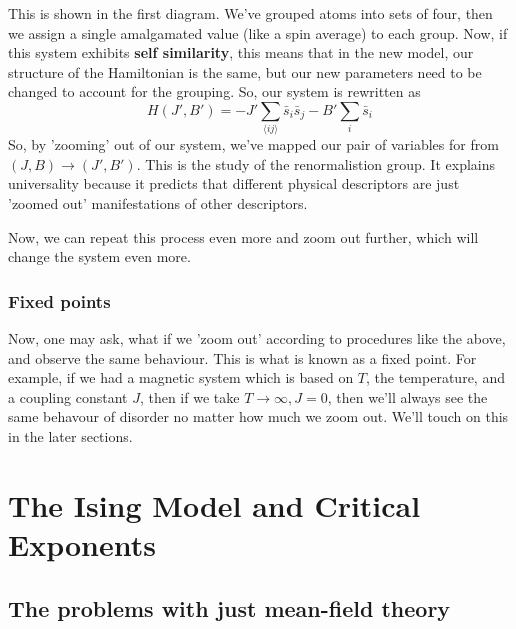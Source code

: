 \documentclass[11pt, oneside]{article}   	%
\begin{document}
This is shown in the first diagram. We've grouped atoms into sets of four, then we assign a single amalgamated value (like a spin average) to each group. Now, if this system exhibits \textbf{self similarity}, this means that in the new model, our structure of the Hamiltonian is the same, but our new parameters need to be changed to account for the grouping. So, our system is rewritten as \[ 
	H(J', B') = - J' \sum_{ \langle ij \rangle } \bar{s}_i \bar{s}_j  -  B' \sum_i \bar{ s}_i \]
So, by 'zooming' out of our system, we've mapped our pair of variables for from $(J, B) \rightarrow (J', B') $. This is the study of the renormalistion group. It explains universality because it predicts that different physical descriptors are just 'zoomed out' manifestations of other descriptors.  

Now, we can repeat this process even more and zoom out further, which will change the system even more. 
\subsubsection{Fixed points} 
Now, one may ask, what if we 'zoom out' according to procedures like the above, and observe the same behaviour. This is what is known as a fixed point. For example, if we had a magnetic system which is based on $T$, the temperature, and a coupling constant $J$, then if we take $T \rightarrow \infty, J = 0$, then we'll always see the same behavour of disorder no matter how much we zoom out. We'll touch on this in the later sections.

 
\section{The Ising Model and Critical Exponents}
\subsection{The problems with just mean-field theory}
\end{document}
